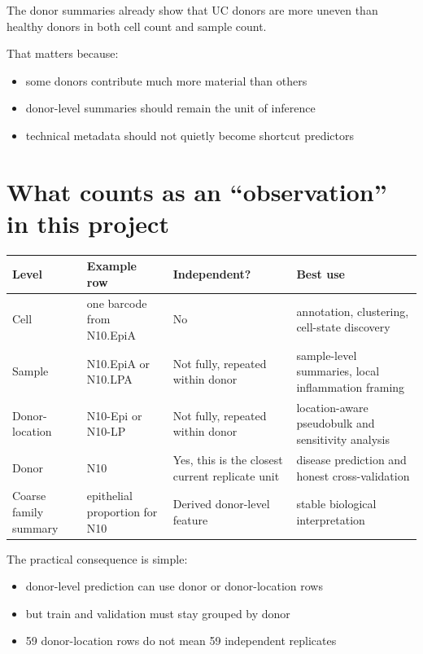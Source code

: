 \documentclass[11pt]{article}
\begin{document}
The donor summaries already show that UC donors are more uneven than healthy
donors in both cell count and sample count.

That matters because:

\begin{itemize}
  \item some donors contribute much more material than others
  \item donor-level summaries should remain the unit of inference
  \item technical metadata should not quietly become shortcut predictors
\end{itemize}

\section*{What counts as an ``observation'' in this project}

\begin{center}
\begin{tabular}{>{\raggedright\arraybackslash}p{2.1cm} >{\raggedright\arraybackslash}p{3.0cm} >{\raggedright\arraybackslash}p{2.4cm} >{\raggedright\arraybackslash}p{4.8cm}}
\toprule
\textbf{Level} & \textbf{Example row} & \textbf{Independent?} & \textbf{Best use} \\
\midrule
Cell & one barcode from N10.EpiA & No & annotation, clustering, cell-state discovery \\
Sample & N10.EpiA or N10.LPA & Not fully, repeated within donor & sample-level summaries, local inflammation framing \\
Donor-location & N10-Epi or N10-LP & Not fully, repeated within donor & location-aware pseudobulk and sensitivity analysis \\
Donor & N10 & Yes, this is the closest current replicate unit & disease prediction and honest cross-validation \\
Coarse family summary & epithelial proportion for N10 & Derived donor-level feature & stable biological interpretation \\
\bottomrule
\end{tabular}
\end{center}

The practical consequence is simple:

\begin{itemize}
  \item donor-level prediction can use donor or donor-location rows
  \item but train and validation must stay grouped by donor
  \item 59 donor-location rows do not mean 59 independent replicates
\end{itemize}
\end{document}

